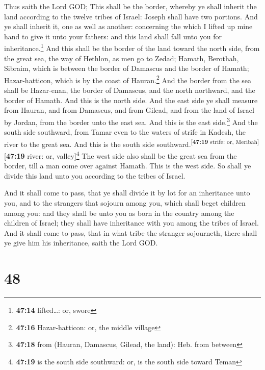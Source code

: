 Thus saith the Lord GOD; This shall be the border,
whereby ye shall inherit the land according to the twelve tribes of
Israel: Joseph shall have two portions.  And ye shall
inherit it, one as well as another: concerning the which I lifted up
mine hand to give it unto your fathers: and this land shall fall unto
you for inheritance.\footnote{\textbf{47:14} lifted\ldots: or, swore}
 And this shall be the border of the land toward the
north side, from the great sea, the way of Hethlon, as men go to Zedad;
 Hamath, Berothah, Sibraim, which is between the border
of Damascus and the border of Hamath; Hazar-hatticon, which is by the
coast of Hauran.\footnote{\textbf{47:16} Hazar-hatticon: or, the middle
  village}  And the border from the sea shall be
Hazar-enan, the border of Damascus, and the north northward, and the
border of Hamath. And this is the north side.  And the
east side ye shall measure from Hauran, and from Damascus, and from
Gilead, and from the land of Israel by Jordan, from the border unto the
east sea. And this is the east side.\footnote{\textbf{47:18} from
  (Hauran, Damascus, Gilead, the land): Heb. from between}
 And the south side southward, from Tamar even to the
waters of strife in Kadesh, the river to the great sea. And this is the
south side southward.\textsuperscript{{[}\textbf{47:19} strife: or,
Meribah{]}}{[}\textbf{47:19} river: or, valley{]}\footnote{\textbf{47:19}
  is the south side southward: or, is the south side toward Teman}
 The west side also shall be the great sea from the
border, till a man come over against Hamath. This is the west side.
 So shall ye divide this land unto you according to the
tribes of Israel.

 And it shall come to pass, that ye shall divide it by
lot for an inheritance unto you, and to the strangers that sojourn among
you, which shall beget children among you: and they shall be unto you as
born in the country among the children of Israel; they shall have
inheritance with you among the tribes of Israel.  And it
shall come to pass, that in what tribe the stranger sojourneth, there
shall ye give him his inheritance, saith the Lord GOD.

\hypertarget{section-47}{%
\section{48}\label{section-47}}

